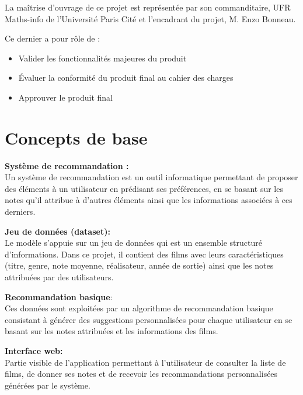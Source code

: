 \documentclass[a4paper,12pt]{report}
\begin{document}
La maîtrise d'ouvrage de ce projet est représentée par son
commanditaire, UFR Maths-info de l'Université Paris Cité et l'encadrant du projet, M. Enzo Bonneau.

Ce dernier a pour rôle de :

\begin{itemize}
    \item Valider les fonctionnalités majeures du produit
    \item Évaluer la conformité du produit final au cahier des charges
    \item Approuver le produit final
\end{itemize}


\chapter{Concepts de base}
\textbf{Système de recommandation :} \\
Un système de recommandation est un outil informatique permettant de proposer des éléments à un utilisateur en prédisant ses préférences, en se basant sur les notes qu’il attribue à d'autres éléments ainsi que les informations associées à ces derniers.

\textbf{Jeu de données (dataset):} \\
\label{JD1}
Le modèle s'appuie sur un jeu de données qui est un ensemble structuré d’informations. Dans ce projet, il contient des films avec leurs caractéristiques (titre, genre, note moyenne, réalisateur, année de sortie) ainsi que les notes attribuées par des utilisateurs.

\textbf{Recommandation basique}: \\
\label{algorec}
Ces données sont exploitées par un algorithme de recommandation basique consistant à générer des suggestions personnalisées pour chaque utilisateur en se basant sur les notes attribuées et les informations des films.

\textbf{Interface web:} \\
Partie visible de l’application permettant à l’utilisateur de consulter la liste de films, de donner ses notes et de recevoir les recommandations personnalisées générées par le système.
\end{document}
